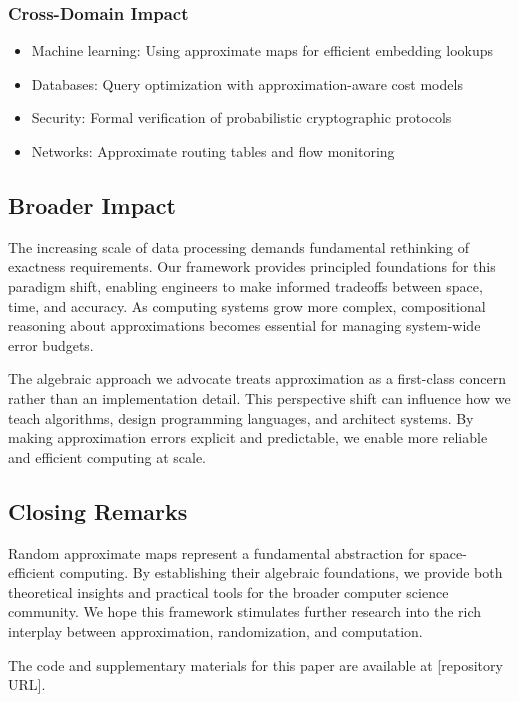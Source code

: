 \subsubsection{Cross-Domain Impact}
\begin{itemize}
    \item Machine learning: Using approximate maps for efficient embedding lookups
    \item Databases: Query optimization with approximation-aware cost models
    \item Security: Formal verification of probabilistic cryptographic protocols
    \item Networks: Approximate routing tables and flow monitoring
\end{itemize}

\subsection{Broader Impact}

The increasing scale of data processing demands fundamental rethinking of exactness requirements.
Our framework provides principled foundations for this paradigm shift, enabling engineers to make informed tradeoffs between space, time, and accuracy.
As computing systems grow more complex, compositional reasoning about approximations becomes essential for managing system-wide error budgets.

The algebraic approach we advocate treats approximation as a first-class concern rather than an implementation detail.
This perspective shift can influence how we teach algorithms, design programming languages, and architect systems.
By making approximation errors explicit and predictable, we enable more reliable and efficient computing at scale.

\subsection{Closing Remarks}

Random approximate maps represent a fundamental abstraction for space-efficient computing.
By establishing their algebraic foundations, we provide both theoretical insights and practical tools for the broader computer science community.
We hope this framework stimulates further research into the rich interplay between approximation, randomization, and computation.

The code and supplementary materials for this paper are available at [repository URL].